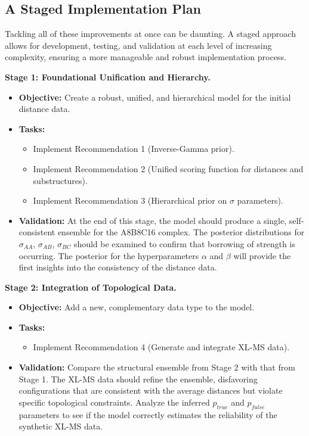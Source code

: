 \documentclass{article}
\begin{document}
\subsection{A Staged Implementation Plan}

Tackling all of these improvements at once can be daunting. A staged approach allows for development, testing, and validation at each level of increasing complexity, ensuring a more manageable and robust implementation process.

\textbf{Stage 1: Foundational Unification and Hierarchy.}

\begin{itemize}
  \item \textbf{Objective:} Create a robust, unified, and hierarchical model for the initial distance data.
  \item \textbf{Tasks:}
    \begin{itemize}
      \item Implement Recommendation 1 (Inverse-Gamma prior).
      \item Implement Recommendation 2 (Unified scoring function for distances and substructures).
      \item Implement Recommendation 3 (Hierarchical prior on $\sigma$ parameters).
    \end{itemize}
  \item \textbf{Validation:} At the end of this stage, the model should produce a single, self-consistent ensemble for the A8B8C16 complex. The posterior distributions for $\sigma_{AA}$, $\sigma_{AB}$, $\sigma_{BC}$ should be examined to confirm that borrowing of strength is occurring. The posterior for the hyperparameters $\alpha$ and $\beta$ will provide the first insights into the consistency of the distance data.
\end{itemize}

\textbf{Stage 2: Integration of Topological Data.}

\begin{itemize}
  \item \textbf{Objective:} Add a new, complementary data type to the model.
  \item \textbf{Tasks:}
    \begin{itemize}
      \item Implement Recommendation 4 (Generate and integrate XL-MS data).
    \end{itemize}
  \item \textbf{Validation:} Compare the structural ensemble from Stage 2 with that from Stage 1. The XL-MS data should refine the ensemble, disfavoring configurations that are consistent with the average distances but violate specific topological constraints. Analyze the inferred $p_{true}$ and $p_{false}$ parameters to see if the model correctly estimates the reliability of the synthetic XL-MS data.
\end{itemize}
\end{document}

